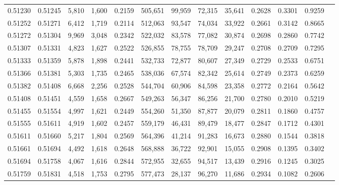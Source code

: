 \begin{tabular}{rrrrrrrrrrrrr}
0.51230 & 0.51245 &  5,810 & 1,600 &                                     0.2159 & 505,651 &  99,959 &  72,315 &  35,641 & 0.2628 & 0.3301 & 0.9259 \\
0.51252 & 0.51271 &  6,412 & 1,719 &                                     0.2114 & 512,063 &  93,547 &  74,034 &  33,922 & 0.2661 & 0.3142 & 0.8665 \\
0.51272 & 0.51304 &  9,969 & 3,048 &                                     0.2342 & 522,032 &  83,578 &  77,082 &  30,874 & 0.2698 & 0.2860 & 0.7742 \\
0.51307 & 0.51331 &  4,823 & 1,627 &                                     0.2522 & 526,855 &  78,755 &  78,709 &  29,247 & 0.2708 & 0.2709 & 0.7295 \\
0.51333 & 0.51359 &  5,878 & 1,898 &                                     0.2441 & 532,733 &  72,877 &  80,607 &  27,349 & 0.2729 & 0.2533 & 0.6751 \\
0.51366 & 0.51381 &  5,303 & 1,735 &                                     0.2465 & 538,036 &  67,574 &  82,342 &  25,614 & 0.2749 & 0.2373 & 0.6259 \\
0.51382 & 0.51408 &  6,668 & 2,256 &                                     0.2528 & 544,704 &  60,906 &  84,598 &  23,358 & 0.2772 & 0.2164 & 0.5642 \\
0.51408 & 0.51451 &  4,559 & 1,658 &                                     0.2667 & 549,263 &  56,347 &  86,256 &  21,700 & 0.2780 & 0.2010 & 0.5219 \\
0.51455 & 0.51554 &  4,997 & 1,621 &                                     0.2449 & 554,260 &  51,350 &  87,877 &  20,079 & 0.2811 & 0.1860 & 0.4757 \\
0.51555 & 0.51611 &  4,919 & 1,602 &                                     0.2457 & 559,179 &  46,431 &  89,479 &  18,477 & 0.2847 & 0.1712 & 0.4301 \\
0.51611 & 0.51660 &  5,217 & 1,804 &                                     0.2569 & 564,396 &  41,214 &  91,283 &  16,673 & 0.2880 & 0.1544 & 0.3818 \\
0.51661 & 0.51694 &  4,492 & 1,618 &                                     0.2648 & 568,888 &  36,722 &  92,901 &  15,055 & 0.2908 & 0.1395 & 0.3402 \\
0.51694 & 0.51758 &  4,067 & 1,616 &                                     0.2844 & 572,955 &  32,655 &  94,517 &  13,439 & 0.2916 & 0.1245 & 0.3025 \\
0.51759 & 0.51831 &  4,518 & 1,753 &                                     0.2795 & 577,473 &  28,137 &  96,270 &  11,686 & 0.2934 & 0.1082 & 0.2606 \\

\end{tabular}
